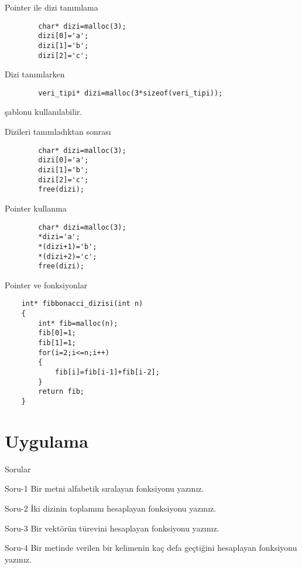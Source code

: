 \begin{frame}[fragile]{Pointer ile dizi tanımlama}
    \begin{lstlisting}
        char* dizi=malloc(3);
        dizi[0]='a';
        dizi[1]='b';
        dizi[2]='c';\end{lstlisting}
    Dizi tanımlarken
    \begin{lstlisting}
        veri_tipi* dizi=malloc(3*sizeof(veri_tipi));\end{lstlisting}
        şablonu kullanılabilir.
\end{frame}
\begin{frame}[fragile]{Dizileri tanımladıktan sonrası}
    \begin{lstlisting}
        char* dizi=malloc(3);
        dizi[0]='a';
        dizi[1]='b';
        dizi[2]='c';
        free(dizi);\end{lstlisting}
\end{frame}
\begin{frame}[fragile]{Pointer kullanma}
    \begin{lstlisting}
        char* dizi=malloc(3);
        *dizi='a';
        *(dizi+1)='b';
        *(dizi+2)='c';
        free(dizi);\end{lstlisting}
\end{frame}
\begin{frame}[fragile]{Pointer ve fonksiyonlar}
    \begin{lstlisting}
    int* fibbonacci_dizisi(int n)
    {
        int* fib=malloc(n);
        fib[0]=1;
        fib[1]=1;
        for(i=2;i<=n;i++)
        {
            fib[i]=fib[i-1]+fib[i-2];
        }
        return fib;
    }
    \end{lstlisting}
\end{frame}
\section{Uygulama}
\begin{frame}[fragile]{Sorular}
    \begin{alertblock}{Soru-1}
        Bir metni alfabetik sıralayan fonksiyonu yazınız.
    \end{alertblock}
    \begin{alertblock}{Soru-2}
        İki dizinin toplamını hesaplayan fonksiyonu yazınız.
    \end{alertblock}
    \begin{alertblock}{Soru-3}
        Bir vektörün türevini hesaplayan fonksiyonu yazınız.
    \end{alertblock}
    \begin{alertblock}{Soru-4}
        Bir metinde verilen bir kelimenin kaç defa geçtiğini hesaplayan fonksiyonu yazınız.
    \end{alertblock}
\end{frame}

